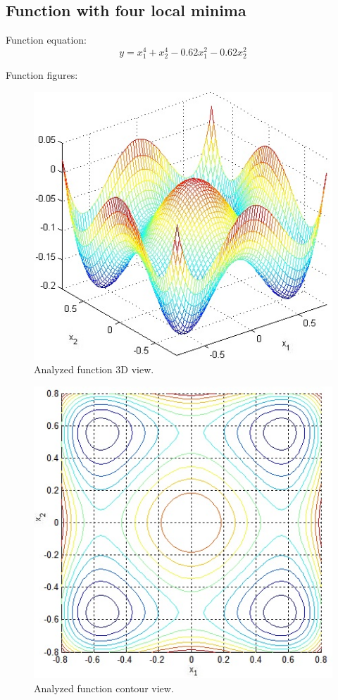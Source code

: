 \documentclass[12pt]{article}
\begin{document}
\subsection{Function with four local minima}
Function equation:
\begin{equation}
y=x_1^4+x_2^4-0.62x_1^2-0.62x_2^2
\end{equation}

Function figures:
	\begin{figure}[H]
		\includegraphics[width=12cm]{four_3d.jpg}
		\caption{Analyzed function 3D view.}
	\end{figure}
	\begin{figure}[H]
			\includegraphics[width=12cm]{four_cont.jpg}
		\caption{Analyzed function contour view.}
	\end{figure}	
\end{document}
